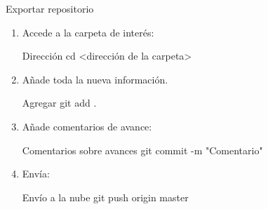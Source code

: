 \begin{frame}[t]{Exportar repositorio}\vspace{-2pt}

\begin{enumerate}
	\item Accede a la carpeta de interés:
	\begin{block}{Dirección}
		cd <dirección de la carpeta>
	\end{block}
	\item Añade toda la nueva información.
	\begin{block}{Agregar}
		git add .
	\end{block}
	\item Añade comentarios de avance:
	\begin{block}{Comentarios sobre avances}
		git commit -m "Comentario"
	\end{block}
	\item Envía:
	\begin{block}{Envío a la nube}
		git push origin master
	\end{block}
\end{enumerate}


\end{frame}